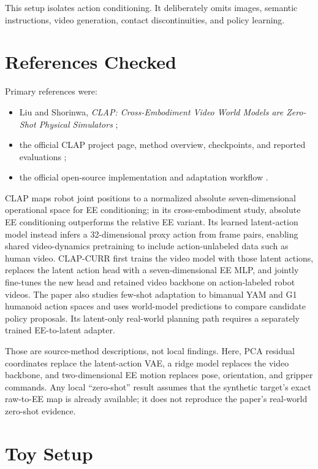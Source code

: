 \documentclass[11pt]{article}
\begin{document}
This setup isolates action conditioning. It deliberately omits images, semantic instructions, video generation, contact discontinuities, and policy learning.

\section{References Checked}

Primary references were:
\begin{itemize}[leftmargin=1.5em]
  \item Liu and Shorinwa, \emph{CLAP: Cross-Embodiment Video World Models are Zero-Shot Physical Simulators} \cite{paper};
  \item the official CLAP project page, method overview, checkpoints, and reported evaluations \cite{project};
  \item the official open-source implementation and adaptation workflow \cite{code}.
\end{itemize}

CLAP maps robot joint positions to a normalized absolute seven-dimensional operational space for EE conditioning; in its cross-embodiment study, absolute EE conditioning outperforms the relative EE variant. Its learned latent-action model instead infers a 32-dimensional proxy action from frame pairs, enabling shared video-dynamics pretraining to include action-unlabeled data such as human video. CLAP-CURR first trains the video model with those latent actions, replaces the latent action head with a seven-dimensional EE MLP, and jointly fine-tunes the new head and retained video backbone on action-labeled robot videos. The paper also studies few-shot adaptation to bimanual YAM and G1 humanoid action spaces and uses world-model predictions to compare candidate policy proposals. Its latent-only real-world planning path requires a separately trained EE-to-latent adapter.

Those are source-method descriptions, not local findings. Here, PCA residual coordinates replace the latent-action VAE, a ridge model replaces the video backbone, and two-dimensional EE motion replaces pose, orientation, and gripper commands. Any local ``zero-shot'' result assumes that the synthetic target's exact raw-to-EE map is already available; it does not reproduce the paper's real-world zero-shot evidence.

\section{Toy Setup}
\end{document}
